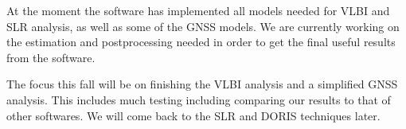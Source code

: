 At the moment the software has implemented all models needed for VLBI and SLR
analysis, as well as some of the GNSS models. We are currently working on the
estimation and postprocessing needed in order to get the final useful results
from the software.

The focus this fall will be on finishing the VLBI analysis and a simplified GNSS
analysis. This includes much testing including comparing our results to that of
other softwares. We will come back to the SLR and DORIS techniques later.

\endinput
